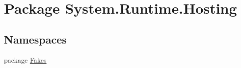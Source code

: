 \hypertarget{namespace_system_1_1_runtime_1_1_hosting}{\section{Package System.\-Runtime.\-Hosting}
\label{namespace_system_1_1_runtime_1_1_hosting}
}
\subsection*{Namespaces}
\begin{DoxyCompactItemize}
\item 
package \hyperlink{namespace_system_1_1_runtime_1_1_hosting_1_1_fakes}{Fakes}
\end{DoxyCompactItemize}
